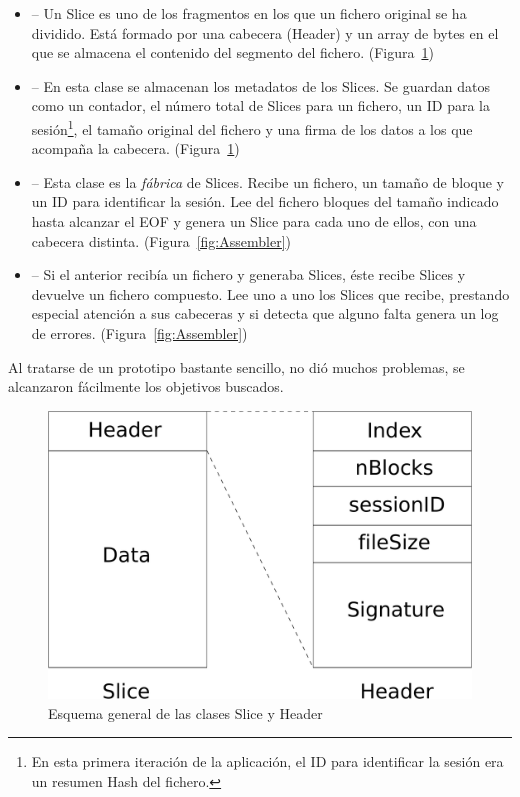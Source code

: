 \begin{itemize}
  \item {} -- Un Slice es uno de los fragmentos en los que un
  fichero original se ha dividido. Está formado por una cabecera (Header) y un
  array de bytes en el que se almacena el contenido del segmento del fichero.
  (Figura~\ref{fig:Slice_Header})

  \item {} -- En esta clase se almacenan los metadatos de los
  Slices. Se guardan datos como un contador, el número total de Slices
  para un fichero, un ID para la sesión\footnote{En esta primera iteración de la
  aplicación, el ID para identificar la sesión era un resumen Hash del fichero.},
  el tamaño original del fichero y una firma de los datos a los que acompaña la cabecera.
  (Figura~\ref{fig:Slice_Header})

  \item {} -- Esta clase es la \emph{fábrica} de Slices. Recibe
  un fichero, un tamaño de bloque y un ID para identificar la sesión. Lee del
  fichero bloques del tamaño indicado hasta alcanzar el EOF y genera un Slice
  para cada uno de ellos, con una cabecera distinta. (Figura~\ref{fig:Assembler})

  \item {} -- Si el anterior recibía un fichero y generaba Slices,
  éste recibe Slices y devuelve un fichero compuesto. Lee uno a uno los Slices
  que recibe, prestando especial atención a sus cabeceras y si detecta que
  alguno falta genera un log de errores. (Figura~\ref{fig:Assembler})
\end{itemize}

Al tratarse de un prototipo bastante sencillo, no dió muchos problemas, se
alcanzaron fácilmente los objetivos buscados.

\begin{figure}[ht]
  \centering
  \includegraphics[scale=0.4]{Figures/Slice_Header}
  \decoRule
  \caption[Slice - Header]{Esquema general de las clases Slice y Header}
  \label{fig:Slice_Header}
\end{figure}


